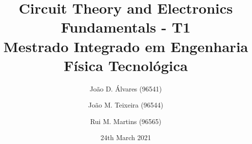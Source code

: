 \title{\textbf{Circuit Theory and Electronics Fundamentals - T1}\\ \normalsize{Mestrado Integrado em Engenharia Física Tecnológica}}
\author[1]{João D. Álvares (96541)}
\author[1]{João M. Teixeira (96544)}
\author[1]{Rui M. Martins (96565)}


\date{24th March 2021}